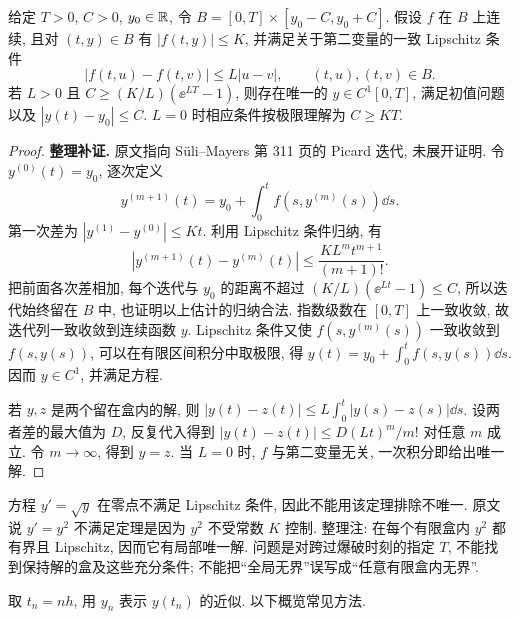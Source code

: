 \begin{theorem}\label{thm:picard}
给定 $T>0$, $C>0$, $y_0\in\mathbb R$, 令 $B=[0,T]\times[y_0-C,y_0+C]$. 假设 $f$ 在 $B$ 上连续, 且对 $(t,y)\in B$ 有 $|f(t,y)|\leq K$, 并满足关于第二变量的一致 Lipschitz 条件
\[
|f(t,u)-f(t,v)|\leq L|u-v|,
\qquad(t,u),(t,v)\in B.
\]
若 $L>0$ 且 $C\geq(K/L)(\ee^{LT}-1)$, 则存在唯一的 $y\in C^1[0,T]$, 满足初值问题以及 $|y(t)-y_0|\leq C$. $L=0$ 时相应条件按极限理解为 $C\geq KT$.
\end{theorem}
\begin{proof}
\textbf{整理补证.} 原文指向 Süli--Mayers 第 311 页的 Picard 迭代, 未展开证明. 令 $y^{(0)}(t)=y_0$, 逐次定义
\[
y^{(m+1)}(t)=y_0+\int_0^t f(s,y^{(m)}(s))\dd s.
\]
第一次差为 $|y^{(1)}-y^{(0)}|\leq Kt$. 利用 Lipschitz 条件归纳, 有
\[
|y^{(m+1)}(t)-y^{(m)}(t)|\leq\frac{KL^m t^{m+1}}{(m+1)!}.
\]
把前面各次差相加, 每个迭代与 $y_0$ 的距离不超过 $(K/L)(\ee^{Lt}-1)\leq C$, 所以迭代始终留在 $B$ 中, 也证明以上估计的归纳合法. 指数级数在 $[0,T]$ 上一致收敛, 故迭代列一致收敛到连续函数 $y$. Lipschitz 条件又使 $f(s,y^{(m)}(s))$ 一致收敛到 $f(s,y(s))$, 可以在有限区间积分中取极限, 得 $y(t)=y_0+\int_0^tf(s,y(s))\dd s$. 因而 $y\in C^1$, 并满足方程.

若 $y,z$ 是两个留在盒内的解, 则 $|y(t)-z(t)|\leq L\int_0^t|y(s)-z(s)|\dd s$. 设两者差的最大值为 $D$, 反复代入得到 $|y(t)-z(t)|\leq D(Lt)^m/m!$ 对任意 $m$ 成立. 令 $m\to\infty$, 得到 $y=z$. 当 $L=0$ 时, $f$ 与第二变量无关, 一次积分即给出唯一解.
\end{proof}

方程 $y'=\sqrt y$ 在零点不满足 Lipschitz 条件, 因此不能用该定理排除不唯一. 原文说 $y'=y^2$ 不满足定理是因为 $y^2$ 不受常数 $K$ 控制. 整理注: 在每个有限盒内 $y^2$ 都有界且 Lipschitz, 因而它有局部唯一解. 问题是对跨过爆破时刻的指定 $T$, 不能找到保持解的盒及这些充分条件; 不能把“全局无界”误写成“任意有限盒内无界”.


取 $t_n=nh$, 用 $y_n$ 表示 $y(t_n)$ 的近似. 以下概览常见方法.

